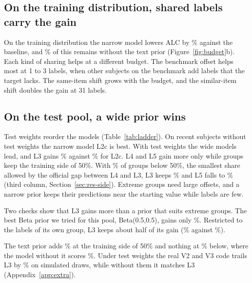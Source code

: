 \documentclass{article}
\begin{document}
\subsection{On the training distribution, shared labels carry the gain}
\label{sec:res-structure}
On the training distribution the narrow model lowers ALC by \ShortConfRel\% against the baseline, and \ConfShareStructure\% of this remains without the text prior (Figure~\ref{fig:budget}b).
Each kind of sharing helps at a different budget.
The benchmark offset helps most at 1 to 3 labels, when other subjects on the benchmark add labels that the target lacks.
The same-item shift grows with the budget, and the similar-item shift doubles the gain at 31 labels.

\subsection{On the test pool, a wide prior wins}
\label{sec:res-testpool}
Test weights reorder the models (Table~\ref{tab:ladder}).
On recent subjects without test weights the narrow model L2c is best.
With test weights the wide models lead, and L3 gains \PRCOLthreeAbs\% against \PRCOLtwocAbs\% for L2c. L4 and L5 gain more only while groups keep the training side of 50\%. With \ShortPiGrid\% of groups below 50\%, the smallest share allowed by the official gap between L4 and L3, L3 keeps \PRCSLthreeAbs\% and L5 falls to \PRCSLfiveAbs\% (third column, Section~\ref{sec:res-side}).
Extreme groups need large offsets, and a narrow prior keeps their predictions near the starting value while labels are few.

Two checks show that L3 gains more than a prior that suits extreme groups.
The best Beta prior we tried for this pool, Beta(0.5,0.5), gains only \ShortBhalf\%.
Restricted to the labels of its own group, L3 keeps about half of its gain (\PRCOLthreeownAbs\% against \PRCOLthreeAbs\%).

The text prior adds \ShortTextThree\% at the training side of 50\% and nothing at \ShortPiGrid\% below, where the model without it scores \PRCSWkernel\%.
Under test weights the real V2 and V3 code trails L3 by \ShortRepTwo\% on simulated draws, while without them it matches L3 (Appendix~\ref{app:extra}).
\end{document}

